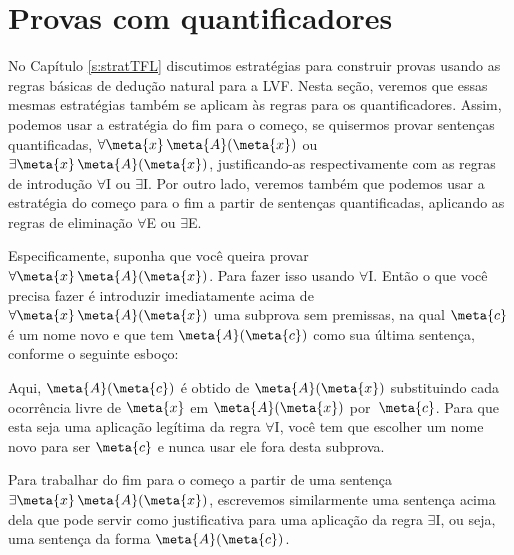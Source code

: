   

\chapter{Provas com quantificadores}

No Capítulo \ref{s:stratTFL}  discutimos estratégias para construir provas usando as regras básicas de dedução natural para a LVF.  Nesta seção, veremos que essas mesmas estratégias também se aplicam às regras para os quantificadores. Assim, podemos usar a estratégia do fim para o começo, se quisermos provar sentenças quantificadas,  $\forall \meta{x}\, \atom{\meta{A}}{\meta{x}}$ ou $\exists \meta{x}\, \atom{\meta{A}}{\meta{x}}$, justificando-as respectivamente com as regras de introdução $\forall$I ou $\exists$I. Por outro lado, veremos também que podemos usar a estratégia do começo para o fim a partir de sentenças quantificadas, aplicando as regras de eliminação $\forall$E ou $\exists$E.

Especificamente, suponha que você queira provar $\forall \meta{x}\, \atom{\meta{A}}{\meta{x}}$. Para fazer isso usando $\forall$I. Então o que você precisa fazer é introduzir imediatamente acima de $\forall \meta{x}\, \atom{\meta{A}}{\meta{x}}$ uma subprova sem premissas, na qual $\meta{c}$ é um nome novo e que tem $\atom{\meta{A}}{\meta{c}}$ como sua última sentença, conforme o seguinte esboço:
 
\begin{fitchproof}
\open
	\ellipsesline
\close
\end{fitchproof}

 Aqui, $\atom{\meta{A}}{\meta{c}}$ é obtido de $\atom{\meta{A}}{\meta{x}}$ substituindo cada ocorrência livre de $\meta{x}$ em $\atom{\meta{A}}{\meta{x}}$ por~$\meta{c}$.  Para que esta seja uma aplicação legítima da regra  $\forall$I, você tem que escolher um nome novo para ser $\meta{c}$ e nunca usar ele fora desta subprova.


Para trabalhar do fim para o começo  a partir de uma sentença $\exists \meta{x}\, \atom{\meta{A}}{\meta{x}}$, escrevemos similarmente uma sentença acima dela que pode servir como justificativa para uma aplicação da regra $\exists$I, ou seja, uma sentença da forma $\atom{\meta{A}}{\meta{c}}$. 
\begin{fitchproof}
	\ellipsesline
\end{fitchproof}

